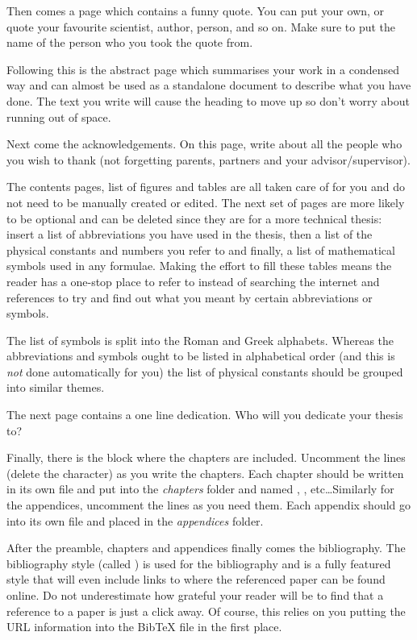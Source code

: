 Then comes a page which contains a funny quote. You can put your own, or quote your favourite scientist, author, person, and so on. Make sure to put the name of the person who you took the quote from.

Following this is the abstract page which summarises your work in a condensed way and can almost be used as a standalone document to describe what you have done. The text you write will cause the heading to move up so don't worry about running out of space.

Next come the acknowledgements. On this page, write about all the people who you wish to thank (not forgetting parents, partners and your advisor/supervisor).

The contents pages, list of figures and tables are all taken care of for you and do not need to be manually created or edited. The next set of pages are more likely to be optional and can be deleted since they are for a more technical thesis: insert a list of abbreviations you have used in the thesis, then a list of the physical constants and numbers you refer to and finally, a list of mathematical symbols used in any formulae. Making the effort to fill these tables means the reader has a one-stop place to refer to instead of searching the internet and references to try and find out what you meant by certain abbreviations or symbols.

The list of symbols is split into the Roman and Greek alphabets. Whereas the abbreviations and symbols ought to be listed in alphabetical order (and this is \emph{not} done automatically for you) the list of physical constants should be grouped into similar themes.

The next page contains a one line dedication. Who will you dedicate your thesis to?

Finally, there is the block where the chapters are included. Uncomment the lines (delete the \code{\%} character) as you write the chapters. Each chapter should be written in its own file and put into the \emph{chapters} folder and named , , etc\ldots Similarly for the appendices, uncomment the lines as you need them. Each appendix should go into its own file and placed in the \emph{appendices} folder.

After the preamble, chapters and appendices finally comes the bibliography. The bibliography style (called ) is used for the bibliography and is a fully featured style that will even include links to where the referenced paper can be found online. Do not underestimate how grateful your reader will be to find that a reference to a paper is just a click away. Of course, this relies on you putting the URL information into the BibTeX file in the first place.

